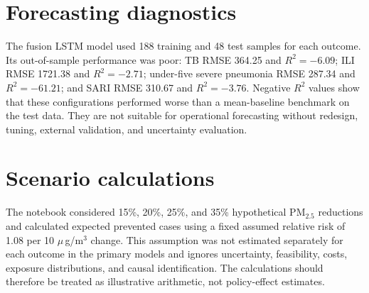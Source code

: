 \documentclass[12pt,a4paper]{report}
\newcommand{\pmfive}{PM$_{2.5}$}
\newcommand{\ugm}{\ensuremath{\mu}\,g/m$^3$}
\begin{document}
\section{Forecasting diagnostics}
The fusion LSTM model used 188 training and 48 test samples for each outcome. Its out-of-sample performance was poor: TB RMSE 364.25 and $R^2=-6.09$; ILI RMSE 1721.38 and $R^2=-2.71$; under-five severe pneumonia RMSE 287.34 and $R^2=-61.21$; and SARI RMSE 310.67 and $R^2=-3.76$. Negative $R^2$ values show that these configurations performed worse than a mean-baseline benchmark on the test data. They are not suitable for operational forecasting without redesign, tuning, external validation, and uncertainty evaluation.

\section{Scenario calculations}
The notebook considered 15\%, 20\%, 25\%, and 35\% hypothetical \pmfive{} reductions and calculated expected prevented cases using a fixed assumed relative risk of 1.08 per 10 \ugm{} change. This assumption was not estimated separately for each outcome in the primary models and ignores uncertainty, feasibility, costs, exposure distributions, and causal identification. The calculations should therefore be treated as illustrative arithmetic, not policy-effect estimates.

\printbibliography
\end{document}
